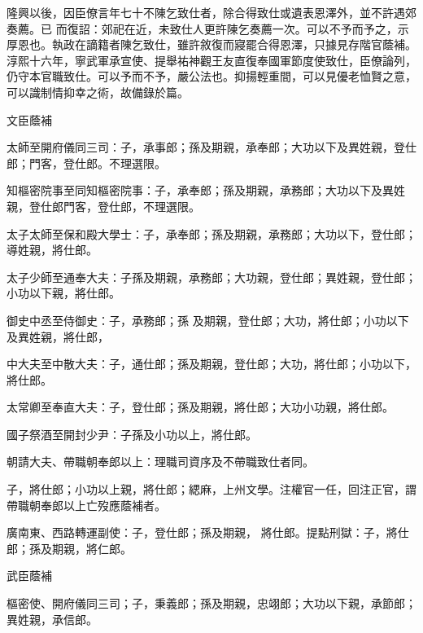 \begin{pinyinscope}
 隆興以後，因臣僚言年七十不陳乞致仕者，除合得致仕或遺表恩澤外，並不許遇郊奏薦。已
 而復詔：郊祀在近，未致仕人更許陳乞奏薦一次。可以不予而予之，示厚恩也。執政在謫籍者陳乞致仕，雖許敘復而寢罷合得恩澤，只據見存階官蔭補。淳熙十六年，寧武軍承宣使、提舉祐神觀王友直復奉國軍節度使致仕，臣僚論列，仍守本官職致仕。可以予而不予，嚴公法也。抑揚輕重間，可以見優老恤賢之意，可以識制情抑幸之術，故備錄於篇。



 文臣蔭補



 太師至開府儀同三司：子，承事郎；孫及期親，承奉郎；大功以下及異姓親，登仕郎；門客，登仕郎。不理選限。



 知樞密院事至同知樞密院事：子，承奉郎；孫及期親，承務郎；大功以下及異姓親，登仕郎門客，登仕郎，不理選限。



 太子太師至保和殿大學士：子，承奉郎；孫及期親，承務郎；大功以下，登仕郎；導姓親，將仕郎。



 太子少師至通奉大夫：子孫及期親，承務郎；大功親，登仕郎；異姓親，登仕郎；小功以下親，將仕郎。



 御史中丞至侍御史：子，承務郎；孫
 及期親，登仕郎；大功，將仕郎；小功以下及異姓親，將仕郎，



 中大夫至中散大夫：子，通仕郎；孫及期親，登仕郎；大功，將仕郎；小功以下，將仕郎。



 太常卿至奉直大夫：子，登仕郎；孫及期親，將仕郎；大功小功親，將仕郎。



 國子祭酒至開封少尹：子孫及小功以上，將仕郎。



 朝請大夫、帶職朝奉郎以上：理職司資序及不帶職致仕者同。



 子，將仕郎；小功以上親，將仕郎；緦麻，上州文學。注權官一任，回注正官，謂帶職朝奉郎以上亡歿應蔭補者。



 廣南東、西路轉運副使：子，登仕郎；孫及期親，
 將仕郎。提點刑獄：子，將仕郎；孫及期親，將仁郎。



 武臣蔭補



 樞密使、開府儀同三司；子，秉義郎；孫及期親，忠翊郎；大功以下親，承節郎；異姓親，承信郎。




\end{pinyinscope}
